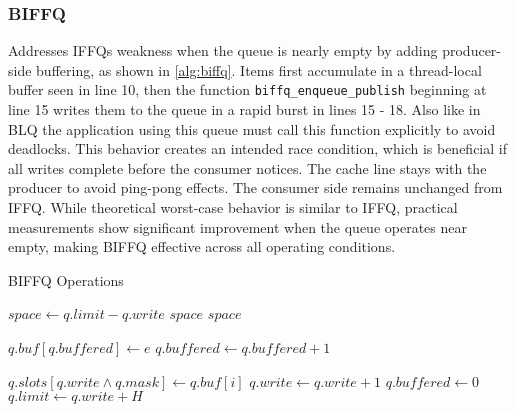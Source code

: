 \subsubsection{\acl{BIFFQ}}
Addresses \acsp{IFFQ} weakness when the queue is nearly empty by adding producer-side buffering, as shown in \cref{alg:biffq}. Items first accumulate in a thread-local buffer seen in line 10, then the function \texttt{biffq\_enqueue\_publish} beginning at line 15 writes them to the queue in a rapid burst in lines 15 - 18. Also like in \ac{BLQ} the application using this queue must call this function explicitly to avoid deadlocks. This behavior creates an intended race condition, which is beneficial if all writes complete before the consumer notices. The cache line stays with the producer to avoid ping-pong effects. The consumer side remains unchanged from \ac{IFFQ}. While theoretical worst-case behavior is similar to \ac{IFFQ}, practical measurements show significant improvement when the queue operates near empty, making \ac{BIFFQ} effective across all operating conditions. \cite{MaffioneCacheAware}

\begin{algorithm}[!ht]
   \centering
   \captionsetup{justification=centering}
   \caption{\acl{BIFFQ} Operations \cite{MaffioneCacheAware}}
   \label{alg:biffq}
   \scriptsize
   \begin{algorithmic}[1]
           \State $space \gets q.limit - q.write$
               \State \Return $space$ 
           \EndIf
           \State \Return $space$
       \EndFunction
       
       \State
       
           \State $q.buf[q.buffered] \gets e$ 
           \State $q.buffered \gets q.buffered + 1$
       \EndFunction
       
       \State
       
               \State $q.slots[q.write \land q.mask] \gets q.buf[i]$ 
               \State $q.write \gets q.write + 1$
           \EndFor
           \State $q.buffered \gets 0$
           \State $q.limit \gets q.write + H$ 
       \EndFunction
   \end{algorithmic}
\end{algorithm}

